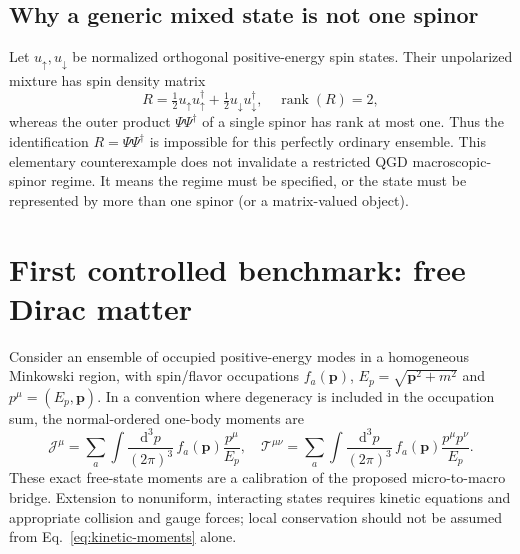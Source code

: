 \documentclass[11pt,a4paper]{article}
\newcommand{\dd}{\mathrm d}
\newcommand{\TT}{\mathcal T}
\newcommand{\JJ}{\mathcal J}
\begin{document}
\subsection{Why a generic mixed state is not one spinor}
Let $u_\uparrow,u_\downarrow$ be normalized orthogonal positive-energy spin states. Their unpolarized mixture has spin density matrix
\begin{equation}\label{eq:rank}
R=\tfrac12u_\uparrow u_\uparrow^\dagger+\tfrac12u_\downarrow u_\downarrow^\dagger,
\quad \operatorname{rank}(R)=2,
\end{equation}
whereas the outer product $\Psi\Psi^\dagger$ of a single spinor has rank at most one. Thus the identification $R=\Psi\Psi^\dagger$ is impossible for this perfectly ordinary ensemble. This elementary counterexample does not invalidate a restricted QGD macroscopic-spinor regime. It means the regime must be specified, or the state must be represented by more than one spinor (or a matrix-valued object).

\section{First controlled benchmark: free Dirac matter}\label{sec:free-ensemble}
Consider an ensemble of occupied positive-energy modes in a homogeneous Minkowski region, with spin/flavor occupations $f_a(\bm p)$, $E_p=\sqrt{\bm p^2+m^2}$ and $p^\mu=(E_p,\bm p)$. In a convention where degeneracy is included in the occupation sum, the normal-ordered one-body moments are
\begin{equation}\label{eq:kinetic-moments}
\JJ^\mu=\sum_a\int\frac{\dd^3p}{(2\pi)^3}\,f_a(\bm p)\frac{p^\mu}{E_p},\quad
\TT^{\mu\nu}=\sum_a\int\frac{\dd^3p}{(2\pi)^3}\,f_a(\bm p)\frac{p^\mu p^\nu}{E_p}.
\end{equation}
These exact free-state moments are a calibration of the proposed micro-to-macro bridge. Extension to nonuniform, interacting states requires kinetic equations and appropriate collision and gauge forces; local conservation should not be assumed from Eq.~\eqref{eq:kinetic-moments} alone.
\end{document}
